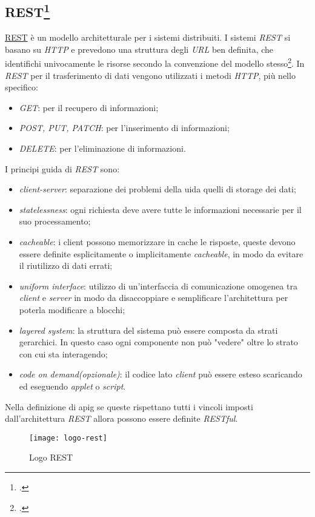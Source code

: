 \subsection{REST\footcite{REST: acronimo di Representational State Transfer}}
\href{https://restfulapi.net/}{REST} è un modello architetturale per i sistemi distribuiti. I sistemi \textit{REST} si basano su \textit{HTTP} e prevedono una struttura degli \textit{URL} ben definita, che identifichi univocamente le risorse secondo la convenzione del modello stesso\footcite{Resource Naming: https://restfulapi.net/resource-naming/}. 
In \textit{REST} per il trasferimento di dati vengono utilizzati i metodi \textit{HTTP}, più nello specifico:
\begin{itemize}
    \item \textit{GET}: per il recupero di informazioni;
    \item \textit{POST, PUT, PATCH}: per l'inserimento di informazioni;
    \item \textit{DELETE}: per l'eliminazione di informazioni.
\end{itemize}
I principi guida di \textit{REST} sono:
\begin{itemize}
    \item \textit{client-server}: separazione dei problemi della \gls{ui}\glsfirstoccur da quelli di storage dei dati;
    \item \textit{statelessness}: ogni richiesta deve avere tutte le informazioni necessarie per il suo processamento;
    \item \textit{cacheable}: i client possono memorizzare in cache le risposte, queste devono essere definite esplicitamente o implicitamente \textit{cacheable}, in modo da evitare il riutilizzo di dati errati;
    \item \textit{uniform interface}: utilizzo di un'interfaccia di comunicazione omogenea tra \textit{client} e \textit{server} in modo da disaccoppiare e semplificare l'architettura per poterla modificare a blocchi;
    \item \textit{layered system}: la struttura del sistema può essere composta da strati gerarchici. In questo caso ogni componente non può "vedere" oltre lo strato con cui sta interagendo;
    \item \textit{code on demand(opzionale)}: il codice lato \textit{client} può essere esteso scaricando ed eseguendo \textit{applet} o \textit{script}.
\end{itemize}
Nella definizione di \gls{apig} se queste rispettano tutti i vincoli imposti dall'architettura \textit{REST} allora possono essere definite \textit{RESTful}.
\begin{figure}[h]
    \begin{center}
    \texttt{[image: logo-rest]}
    \caption{Logo REST}
    \label{fig:figure6}
    \end{center}
\end{figure}

